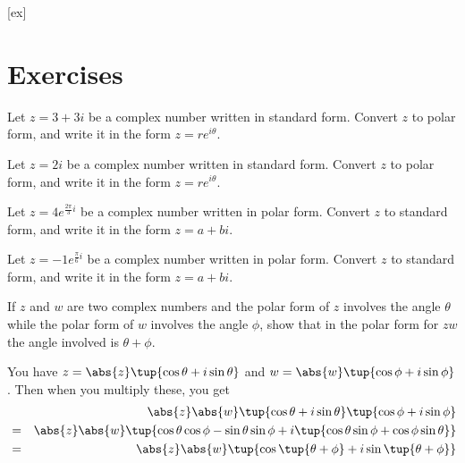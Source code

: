 [ex]
\section*{Exercises}

\begin{enumialphparenastyle}

\begin{ex} Let $z = 3 + 3i$ be a complex number written in standard form. Convert $z$ to polar form, and write it in the form $z = re^{i\theta}$.
\end{ex}

\begin{ex} Let $z = 2i$ be a complex number written in standard form. Convert $z$ to polar form, and write it in the form $z = re^{i\theta}$.
\end{ex}

\begin{ex} Let $z = 4e^{\frac{2\pi}{3}i}$ be a complex number written in polar form. Convert $z$ to standard form, and write it in the form $z = a+bi$.
\end{ex}

\begin{ex} Let $z = -1e^{\frac{\pi}{6}i}$ be a complex number written in polar form. Convert $z$ to standard form, and write it in the form $z = a+bi$.
\end{ex}

\begin{ex} If $z$ and $w$ are two complex numbers and the polar form of $z$
involves the angle $\theta $ while the polar form of $w$ involves the angle 
$\phi$, show that in the polar form for $zw$ the angle involved is $\theta
+\phi$. 
\begin{sol}
 You have $z=\abs{z}\tup{\cos
\theta +i\sin \theta } $ and $w=\abs{w}\tup{\cos
\phi +i\sin \phi }$. Then when you multiply these, you get
\begin{eqnarray*}
&&\abs{z}\abs{w}\tup{\cos \theta +i\sin
\theta } \tup{\cos \phi +i\sin \phi } \\
&=&\abs{z}\abs{w}\tup{\cos \theta \cos
\phi -\sin \theta \sin \phi +i\tup{\cos \theta \sin \phi +\cos \phi \sin
\theta } } \\
&=&\abs{z}\abs{w}\tup{\cos \tup{\theta
+\phi } +i\sin \tup{\theta +\phi } }
\end{eqnarray*}
\end{sol}
\end{ex}

\end{enumialphparenastyle}